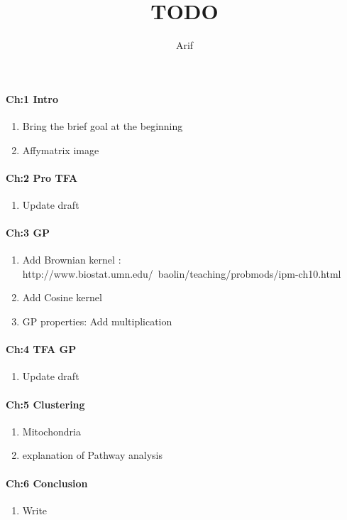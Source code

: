 \documentclass[a4paper,10pt]{article}
\title{TODO}
\author{Arif}
\begin{document}
\maketitle


\paragraph{Ch:1 Intro}
\begin{enumerate}
 \item Bring the brief goal at the beginning 
 \item Affymatrix image
\end{enumerate}

\paragraph{Ch:2 Pro TFA}
\begin{enumerate}
 \item Update draft
\end{enumerate}

\paragraph{Ch:3 GP}
\begin{enumerate}
 \item Add Brownian kernel : http://www.biostat.umn.edu/~baolin/teaching/probmods/ipm-ch10.html
 \item Add Cosine kernel
 \item GP properties: Add multiplication
\end{enumerate}

\paragraph{Ch:4 TFA GP}
\begin{enumerate}
 \item Update draft
\end{enumerate}

\paragraph{Ch:5 Clustering}
\begin{enumerate}
 \item Mitochondria
 \item explanation of Pathway analysis
\end{enumerate}

\paragraph{Ch:6 Conclusion}
\begin{enumerate}
 \item Write
\end{enumerate}
\end{document}
